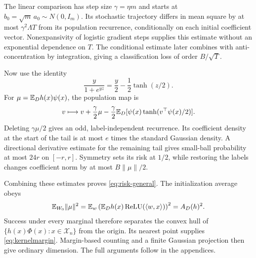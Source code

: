 \documentclass[11pt,letterpaper,pmlr,twoside]{jmlr}
\newcommand{\X}{\mathcal X}\newcommand{\Hc}{\mathcal H}
\newcommand{\relu}{\operatorname{ReLU}}\newcommand{\dc}{\operatorname{dc}}
\newcommand{\ip}[2]{\langle #1,#2\rangle}\newcommand{\norm}[1]{\lVert #1\rVert}
\begin{document}
The linear comparison has step size $\gamma=\eta m$ and starts at $b_0=\sqrt m\,a_0\sim N(0,I_m)$. Its stochastic trajectory differs in mean square by at most $\gamma^2\Lambda T$ from its population recurrence, conditionally on each initial coefficient vector. Nonexpansivity of logistic gradient steps supplies this estimate without an exponential dependence on $T$. The conditional estimate later combines with anti-concentration by integration, giving a classification loss of order $B/\sqrt T$.

Now use the identity
\begin{equation}
 \frac{y}{1+e^{yz}}=\frac y2-\frac12\tanh(z/2).
 \label{eq:logistic-decomp}
\end{equation}
For $\mu=\mathbb E_Dh(x)\psi(x)$, the population map is
\[
 v\longmapsto v+\frac\gamma2\mu
      -\frac\gamma2\mathbb E_D[\psi(x)\tanh(v^\top\psi(x)/2)].
\]
Deleting $\gamma\mu/2$ gives an odd, label-independent recurrence. Its coefficient density at the start of the tail is at most $e$ times the standard Gaussian density. A directional derivative estimate for the remaining tail gives small-ball probability at most $24r$ on $[-r,r]$. Symmetry sets its risk at $1/2$, while restoring the labels changes coefficient norm by at most $B\norm\mu/2$.

Combining these estimates proves \eqref{eq:risk-general}. The initialization average obeys
\[
 \E_{W_0}\norm{\mu}^2
   =\E_w\left(\E_Dh(x)\relu(\ip wx)\right)^2=A_D(h)^2.
\]
Success under every marginal therefore separates the convex hull of $\{h(x)\Phi(x):x\in\X_n\}$ from the origin. Its nearest point supplies \eqref{eq:kernelmargin}. Margin-based counting and a finite Gaussian projection then give ordinary dimension. The full arguments follow in the appendices.
\end{document}
